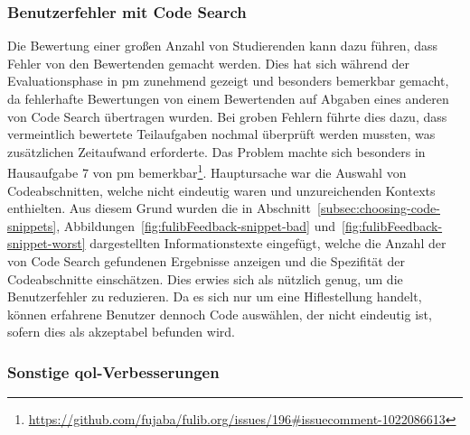 \subsubsection{Benutzerfehler mit Code Search}

Die Bewertung einer großen Anzahl von Studierenden kann dazu führen, dass Fehler von den Bewertenden gemacht werden.
Dies hat sich während der Evaluationsphase in \ac{pm} zunehmend gezeigt und besonders bemerkbar gemacht, da fehlerhafte Bewertungen von einem Bewertenden auf Abgaben eines anderen von Code Search übertragen wurden.
Bei groben Fehlern führte dies dazu, dass vermeintlich bewertete Teilaufgaben nochmal überprüft werden mussten, was zusätzlichen Zeitaufwand erforderte.
Das Problem machte sich besonders in Hausaufgabe 7 von \ac{pm} bemerkbar\footnote{
    \url{https://github.com/fujaba/fulib.org/issues/196\#issuecomment-1022086613}
}.
Hauptursache war die Auswahl von Codeabschnitten, welche nicht eindeutig waren und unzureichenden Kontexts enthielten.
Aus diesem Grund wurden die in Abschnitt~\ref{subsec:choosing-code-snippets}, Abbildungen~\ref{fig:fulibFeedback-snippet-bad} und~\ref{fig:fulibFeedback-snippet-worst} dargestellten Informationstexte eingefügt, welche die Anzahl der von Code Search gefundenen Ergebnisse anzeigen und die Spezifität der Codeabschnitte einschätzen.
Dies erwies sich als nützlich genug, um die Benutzerfehler zu reduzieren.
Da es sich nur um eine Hiflestellung handelt, können erfahrene Benutzer dennoch Code auswählen, der nicht eindeutig ist, sofern dies als akzeptabel befunden wird.

\subsubsection{Sonstige \acl{qol}-Verbesserungen}


